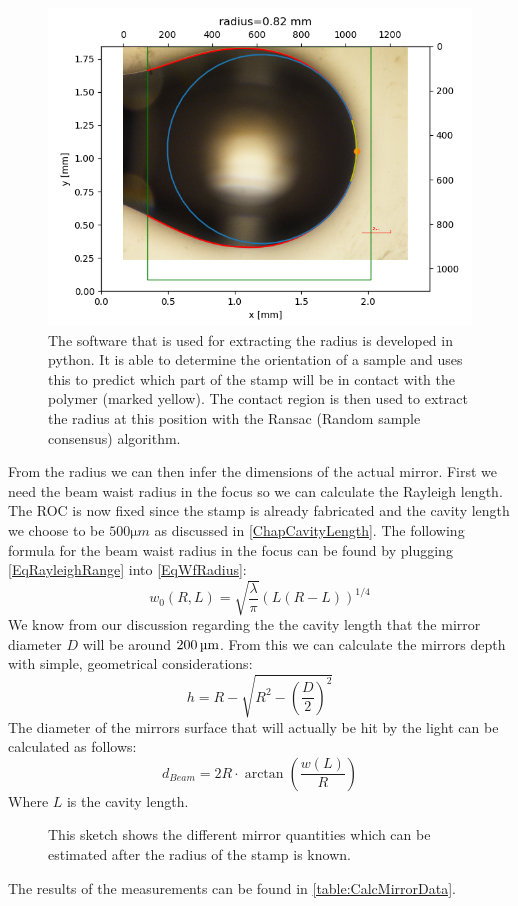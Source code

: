 \begin{figure}[H]
	\includegraphics[scale=0.6]{source/radius_analysis}
	\caption{The software that is used for extracting the radius is developed in python. It is able to determine the orientation of a sample and uses this to predict which part of the stamp will be in contact with the polymer (marked yellow). The contact region is then used to extract the radius at this position with the Ransac (Random sample consensus) algorithm.}
\end{figure}
From the radius we can then infer the dimensions of the actual mirror. First we need the beam waist radius in the focus so we can calculate the Rayleigh length. The ROC is now fixed since the stamp is already fabricated and the cavity length we choose to be $500\si{\micro m}$ as discussed in \autoref{ChapCavityLength}. The following formula for the beam waist radius in the focus can be found by plugging \autoref{EqRayleighRange} into \autoref{EqWfRadius}:
\begin{equation}
	w_0(R, L)=\sqrt{\frac{\lambda}{\pi}}\left(L(R-L)\right)^{1/4}
\end{equation}
We know from our discussion regarding the the cavity length that the mirror diameter $D$ will be around $200\um$. From this we can calculate the mirrors depth with simple, geometrical considerations:
\begin{equation}\label{EqH}
	h=R-\sqrt{R^2-\left(\frac{D}{2}\right)^2}
\end{equation}
The diameter of the mirrors surface that will actually be hit by the light can be calculated as follows:
\begin{equation}
	d_{\si{Beam}}=2R\cdot \arctan\left(\frac{w(L)}{R}\right)
\end{equation}
Where $L$ is the cavity length.
\begin{figure}[H]
	
	\caption{This sketch shows the different mirror quantities which can be estimated after the radius of the stamp is known.}
\end{figure}
The results of the measurements can be found in \autoref{table:CalcMirrorData}.

